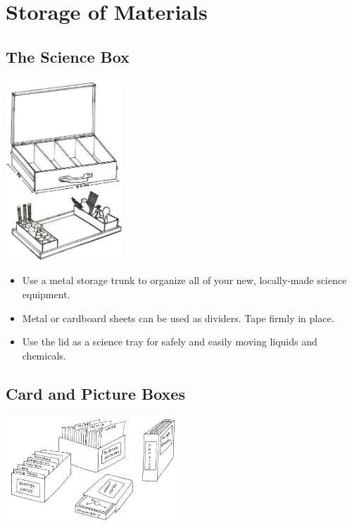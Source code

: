 \chapter{Storage of Materials} 

\begin{multicols}{2}

\section{The Science Box}

\begin{center}
\includegraphics[width=0.33\textwidth]{./img/source/science-box-alt.jpg}
\end{center}

\begin{itemize}
\item Use a metal storage trunk to organize all of your new, locally-made science equipment.
\item Metal or cardboard sheets can be used as dividers. Tape firmly in place.
\item Use the lid as a science tray for safely and easily moving liquids and chemicals.
\end{itemize}


\section{Card and Picture Boxes}

\begin{center}
\includegraphics[width=0.49\textwidth]{./img/vso/card-boxes.jpg}
\end{center}


\end{multicols}
